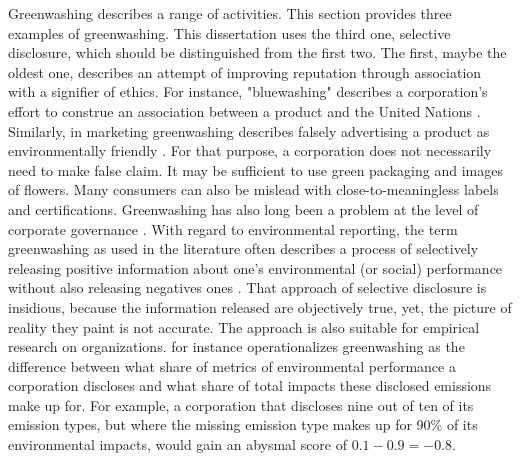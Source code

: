 Greenwashing describes a range of activities. This section provides three examples of greenwashing. This dissertation uses the third one, selective disclosure, which should be distinguished from the first two. The first, maybe the oldest one, describes an attempt of improving reputation through association with a signifier of ethics. For instance, "bluewashing" describes a corporation's effort to construe an association between a product and the United Nations \citep{Laufer2003}. 
Similarly, in marketing greenwashing describes falsely advertising a product as environmentally friendly \citep{Delmas2011}. For that purpose, a corporation does not necessarily need to make false claim. It may be sufficient to use green packaging and images of flowers. Many consumers can also be mislead with close-to-meaningless labels and certifications. 
Greenwashing has also long been a problem at the level of corporate governance \citep{Ramus2005}. With regard to environmental reporting, the term greenwashing as used in the literature often describes a process of selectively releasing positive information about one's environmental (or social) performance without also releasing negatives ones \citep{Lyon2011}. That approach of selective disclosure is insidious, because the information released are objectively true, yet, the picture of reality they paint is not accurate. The approach is also suitable for empirical research on organizations. \citet{Marquis2016} for instance operationalizes greenwashing as the difference between what share of metrics of environmental performance a corporation discloses and what share of total impacts these disclosed emissions make up for. For example, a corporation that discloses nine out of ten of its emission types, but where the missing emission type makes up for 90\% of its environmental impacts, would gain an abysmal score of $0.1 - 0.9 = -0.8$.

